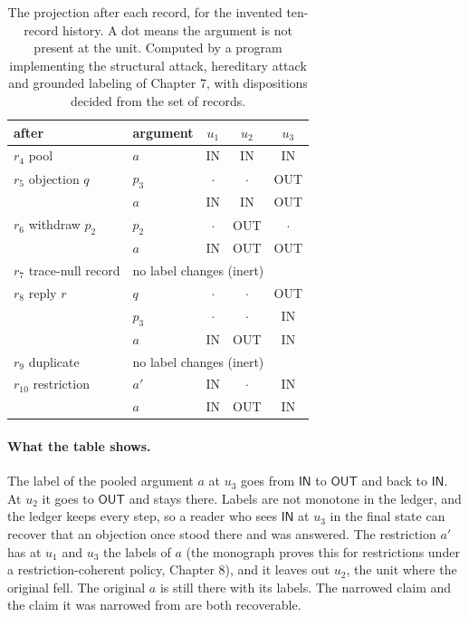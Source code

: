 \documentclass[11pt]{article}
\theoremstyle{plain}
\theoremstyle{definition}
\theoremstyle{remark}
\newcommand{\IN}{\textsf{IN}}
\newcommand{\OUT}{\textsf{OUT}}
\newcommand{\abs}{\cdot}
\begin{document}
\begin{table}[ht]
\centering
\small
\begin{tabular}{@{}llccc@{}}
\toprule
after & argument & $u_1$ & $u_2$ & $u_3$\\
\midrule
$r_4$ pool & $a$ & \IN & \IN & \IN\\
\addlinespace
$r_5$ objection $q$ & $p_3$ & $\abs$ & $\abs$ & \OUT\\
 & $a$ & \IN & \IN & \OUT\\
\addlinespace
$r_6$ withdraw $p_2$ & $p_2$ & $\abs$ & \OUT & $\abs$\\
 & $a$ & \IN & \OUT & \OUT\\
\addlinespace
$r_7$ trace-null record & \multicolumn{4}{l}{no label changes (inert)}\\
\addlinespace
$r_8$ reply $r$ & $q$ & $\abs$ & $\abs$ & \OUT\\
 & $p_3$ & $\abs$ & $\abs$ & \IN\\
 & $a$ & \IN & \OUT & \IN\\
\addlinespace
$r_9$ duplicate & \multicolumn{4}{l}{no label changes (inert)}\\
\addlinespace
$r_{10}$ restriction & $a'$ & \IN & $\abs$ & \IN\\
 & $a$ & \IN & \OUT & \IN\\
\bottomrule
\end{tabular}
\caption{The projection after each record, for the invented ten-record history. A dot means the argument is not present at the unit. Computed by a program implementing the structural attack, hereditary attack and grounded labeling of Chapter 7, with dispositions decided from the set of records.}\label{tab:asof}
\end{table}

\paragraph{What the table shows.} The label of the pooled argument $a$ at $u_3$ goes from $\IN$ to $\OUT$ and back to $\IN$. At $u_2$ it goes to $\OUT$ and stays there. Labels are not monotone in the ledger, and the ledger keeps every step, so a reader who sees $\IN$ at $u_3$ in the final state can recover that an objection once stood there and was answered. The restriction $a'$ has at $u_1$ and $u_3$ the labels of $a$ (the monograph proves this for restrictions under a restriction-coherent policy, Chapter 8), and it leaves out $u_2$, the unit where the original fell. The original $a$ is still there with its labels. The narrowed claim and the claim it was narrowed from are both recoverable.
\end{document}

